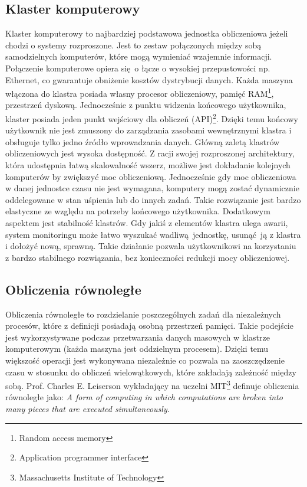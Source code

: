 \subsection{Klaster komputerowy}
Klaster komputerowy to najbardziej podstawowa jednostka obliczeniowa jeżeli chodzi o systemy rozproszone. Jest to zestaw połączonych między sobą samodzielnych komputerów, które mogą wymieniać wzajemnie informacji. Połączenie komputerowe opiera się o łącze o wysokiej przepustowości np. Ethernet, co gwarantuje obniżenie kosztów dystrybucji danych. Każda maszyna włączona do klastra posiada własny procesor obliczeniowy, pamięć RAM\footnote{Random access memory}, przestrzeń dyskową. Jednocześnie z punktu widzenia końcowego użytkownika, klaster posiada jeden punkt wejściowy dla obliczeń (API)\footnote{Application programmer interface}. Dzięki temu końcowy użytkownik nie jest zmuszony do zarządzania zasobami wewnętrznymi klastra i obsługuje tylko jedno źródło wprowadzania danych.\cite{cluster_grid_cloud} 
\newline Główną zaletą klastrów obliczeniowych jest wysoka dostępność. Z racji swojej rozproszonej architektury, która udostępnia łatwą skalowalność wszerz, możliwe jest dokładanie kolejnych komputerów by zwiększyć moc obliczeniową. Jednocześnie gdy moc obliczeniowa w danej jednostce czasu nie jest wymagana, komputery mogą zostać dynamicznie oddelegowane w stan uśpienia lub do innych zadań. Takie rozwiązanie jest bardzo elastyczne ze względu na potrzeby końcowego użytkownika. Dodatkowym aspektem jest stabilność klastrów. Gdy jakiś z elementów klastra ulega awarii, system monitoringu może łatwo wyszukać wadliwą jednostkę, usunąć ją z klastra i dołożyć nową, sprawną. Takie działanie pozwala użytkownikowi na korzystaniu z bardzo stabilnego rozwiązania, bez konieczności redukcji mocy obliczeniowej.\cite{cluster_grid_cloud_detailed_comparison}
\subsection{Obliczenia równoległe}
Obliczenia równoległe to rozdzielanie poszczególnych zadań dla niezależnych procesów, które z definicji posiadają osobną przestrzeń pamięci. Takie podejście jest wykorzystywane podczas przetwarzania danych masowych w klastrze komputerowym (każda maszyna jest oddzielnym procesem). Dzięki temu większość operacji jest wykonywana niezależnie co pozwala na zaoszczędzenie czasu w stosunku do obliczeń wielowątkowych, które zakładają zależność między sobą. Prof. Charles E. Leiserson wykładający na uczelni MIT\footnote{Massachusetts Institute of Technology} definuje obliczenia równoległe jako:
\newline \textit{A form of computing in which computations are broken into many pieces that are executed simultaneously}.\cite{mit_presentation}
